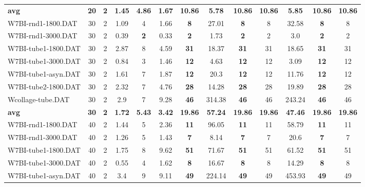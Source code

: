 \begin{table}[h]
{\begin{tabular}{lcccccccccccc}
\cline{1-13} \textbf{avg} & \textbf{20} & \textbf{2} & \textbf{1.45} & \textbf{4.86} & \textbf{1.67} & \textbf{10.86} & \textbf{5.78} & \textbf{10.86} & \textbf{10.86} & \textbf{5.85} & \textbf{10.86} & \textbf{10.86} \\ \cline{1-13}
W7BI-rnd1-1800.DAT & 30 & 2 &  \textcolor{blue2}{1.09} & 4 & 1.66 &  \textbf{8} & 27.01 &  \textbf{8} & 8 & 32.58 &  \textbf{8} & 8 \\
W7BI-rnd1-3000.DAT & 30 & 2 & 0.39 &  \textbf{2} &  \textcolor{blue2}{0.33} &  \textbf{2} & 1.73 &  \textbf{2} & 2 & 3.0 &  \textbf{2} & 2 \\
W7BI-tube1-1800.DAT & 30 & 2 &  \textcolor{blue2}{2.87} & 8 & 4.59 &  \textbf{31} & 18.37 &  \textbf{31} & 31 & 18.65 &  \textbf{31} & 31 \\
W7BI-tube1-3000.DAT & 30 & 2 &  \textcolor{blue2}{0.84} & 3 & 1.46 &  \textbf{12} & 4.63 &  \textbf{12} & 12 & 3.09 &  \textbf{12} & 12 \\
W7BI-tube1-asyn.DAT & 30 & 2 &  \textcolor{blue2}{1.61} & 7 & 1.87 &  \textbf{12} & 20.3 &  \textbf{12} & 12 & 11.76 &  \textbf{12} & 12 \\
W7BI-tube2-1800.DAT & 30 & 2 &  \textcolor{blue2}{2.32} & 7 & 4.76 &  \textbf{28} & 14.28 &  \textbf{28} & 28 & 19.89 &  \textbf{28} & 28 \\
Wcollage-tube.DAT & 30 & 2 &  \textcolor{blue2}{2.9} & 7 & 9.28 &  \textbf{46} & 314.38 &  \textbf{46} & 46 & 243.24 &  \textbf{46} & 46 \\
\cline{1-13} \textbf{avg} & \textbf{30} & \textbf{2} & \textbf{1.72} & \textbf{5.43} & \textbf{3.42} & \textbf{19.86} & \textbf{57.24} & \textbf{19.86} & \textbf{19.86} & \textbf{47.46} & \textbf{19.86} & \textbf{19.86} \\ \cline{1-13}
W7BI-rnd1-1800.DAT & 40 & 2 &  \textcolor{blue2}{1.44} & 5 & 2.36 &  \textbf{11} & 96.05 &  \textbf{11} & 11 & 58.79 &  \textbf{11} & 11 \\
W7BI-rnd1-3000.DAT & 40 & 2 &  \textcolor{blue2}{1.26} & 5 & 1.43 &  \textbf{7} & 8.14 &  \textbf{7} & 7 & 20.6 &  \textbf{7} & 7 \\
W7BI-tube1-1800.DAT & 40 & 2 &  \textcolor{blue2}{1.75} & 8 & 9.62 &  \textbf{51} & 71.67 &  \textbf{51} & 51 & 61.52 &  \textbf{51} & 51 \\
W7BI-tube1-3000.DAT & 40 & 2 &  \textcolor{blue2}{0.55} & 4 & 1.62 &  \textbf{8} & 16.67 &  \textbf{8} & 8 & 14.29 &  \textbf{8} & 8 \\
W7BI-tube1-asyn.DAT & 40 & 2 &  \textcolor{blue2}{3.4} & 9 & 9.11 &  \textbf{49} & 224.14 &  \textbf{49} & 49 & 453.93 &  \textbf{49} & 49 \\

\end{tabular}}
\end{table}
